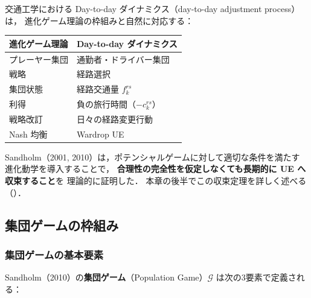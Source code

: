 交通工学における Day-to-day ダイナミクス（day-to-day adjustment process）は，
進化ゲーム理論の枠組みと自然に対応する：

\begin{center}
  \begin{tabular}{ll}
    \toprule
    進化ゲーム理論 & Day-to-day ダイナミクス \\
    \midrule
    プレーヤー集団 & 通勤者・ドライバー集団 \\
    戦略 & 経路選択 \\
    集団状態 & 経路交通量 $f_k^{rs}$ \\
    利得 & 負の旅行時間（$-c_k^{rs}$） \\
    戦略改訂 & 日々の経路変更行動 \\
    Nash 均衡 & Wardrop UE \\
    \bottomrule
  \end{tabular}
\end{center}

Sandholm（2001, 2010）は，ポテンシャルゲームに対して適切な条件を満たす
進化動学を導入することで，
\textbf{合理性の完全性を仮定しなくても長期的に UE へ収束すること}を
理論的に証明した\cite{Sandholm2001,Sandholm2010}．
本章の後半でこの収束定理を詳しく述べる（）．

\subsection{集団ゲームの枠組み}
\label{subsec:population-game}

\subsubsection*{集団ゲームの基本要素}

Sandholm（2010）の\textbf{集団ゲーム}（Population Game）$\mathcal{G}$
は次の3要素で定義される\cite{Sandholm2010}：

